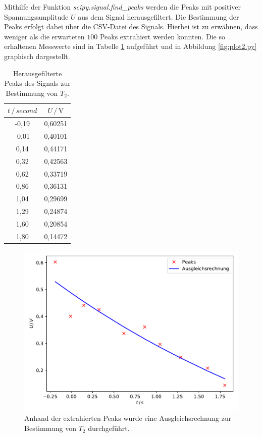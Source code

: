 Mithilfe der Funktion \textit{scipy.signal.find\_peaks}\cite{scipy} 
werden die Peaks mit positiver Spannungsamplitude $U$ aus dem Signal herausgefiltert. Die Bestimmung der Peaks erfolgt 
dabei über die CSV-Datei des Signals. Hierbei ist zu erwähnen, dass weniger als die erwarteten $100$ Peaks extrahiert werden 
konnten.
Die so erhaltenen Messwerte sind in Tabelle \ref{tab:mess2} aufgeführt und in Abbildung \ref{fig:plot2.py} 
graphisch dargestellt. 

\begin{table}
  \centering
  \caption{Herausgefilterte Peaks des Signals zur Bestimmung von $T_2$.}
  \label{tab:mess2}
  \begin{tabular}{c c}
  \toprule
  $t \,/\, \si{second}$ & $U \,/\, \si{\volt}$\\
  \midrule 
      -0,19 & 0,60251\\
      -0,01 & 0,40101\\
       0,14 & 0,44171\\
       0,32 & 0,42563\\
       0,62 & 0,33719\\
       0,86 & 0,36131\\
       1,04 & 0,29699\\
       1,29 & 0,24874\\
       1,60 & 0,20854\\
       1,80 & 0,14472\\
  \bottomrule
  \end{tabular}
\end{table}

\begin{figure}
  \centering
  \includegraphics[scale=0.7]{content/plot2.pdf}
  \caption{Anhand der extrahierten Peaks wurde eine Ausgleichsrechnung zur Bestimmung von $T_2$ durchgeführt.}
  \label{fig:plot2}
\end{figure}

